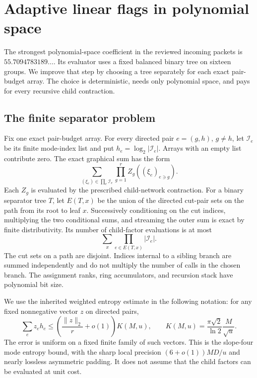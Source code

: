 \section{Adaptive linear flags in polynomial space}
\label{flag:section}

The strongest polynomial-space coefficient in the reviewed incoming packets
is $55.7094783189\ldots$. Its evaluator uses a fixed balanced binary tree
on sixteen groups. We improve that step by choosing a tree separately for
each exact pair-budget array. The choice is deterministic, needs only
polynomial space, and pays for every recursive child contraction.

\subsection{The finite separator problem}

Fix one exact pair-budget array. For every directed pair $e=(g,h)$,
$g\ne h$, let $\mathcal I_e$ be its finite mode-index list and put
$h_e=\log_2|\mathcal I_e|$. Arrays with an empty list contribute zero.
The exact graphical sum has the form
\[
 \sum_{(\xi_e)\in\prod_e\mathcal I_e}
       \prod_{g=1}^r Z_g((\xi_e)_{e\ni g}).
\]
Each $Z_g$ is evaluated by the prescribed child-network contraction.
For a binary separator tree $T$, let $E(T,x)$ be the union of the directed
cut-pair sets on the path from its root to leaf $x$. Successively conditioning
on the cut indices, multiplying the two conditional sums, and streaming the
outer sum is exact by finite distributivity. Its number of child-factor
evaluations is at most
\begin{equation}\label{flag:callcount}
 \sum_x\prod_{e\in E(T,x)}|\mathcal I_e|.
\end{equation}
The cut sets on a path are disjoint. Indices internal to a sibling branch
are summed independently and do not multiply the number of calls in the
chosen branch. The assignment ranks, ring accumulators, and recursion stack
have polynomial bit size.

We use the inherited weighted entropy estimate in the following notation:
for any fixed nonnegative vector $z$ on directed pairs,
\begin{equation}\label{flag:entropy}
 \sum_e z_e h_e\le
 \left(\frac{\|z\|_2}{r}+o(1)\right)K(M,u),\qquad
 K(M,u)=\frac{\pi\sqrt2}{\ln2}\frac{M}{\sqrt u}.
\end{equation}
The error is uniform on a fixed finite family of such vectors. This is the
slope-four mode entropy bound, with the sharp local precision
$(6+o(1))MD/u$ and nearly lossless asymmetric padding. It does not assume
that the child factors can be evaluated at unit cost.


